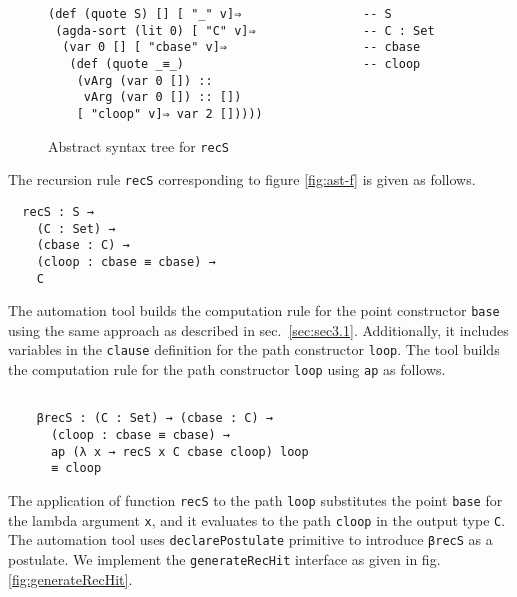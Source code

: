 \documentclass[sigplan,10pt]{acmart}
\begin{document}
\begin{figure}
\begin{center}
\begingroup
\fontsize{7pt}{9pt}\selectfont
\begin{Verbatim}
(def (quote S) [] [ "_" v]⇒                 -- S
 (agda-sort (lit 0) [ "C" v]⇒               -- C : Set
  (var 0 [] [ "cbase" v]⇒                   -- cbase
   (def (quote _≡_)                         -- cloop
    (vArg (var 0 []) ::
     vArg (var 0 []) :: [])
    [ "cloop" v]⇒ var 2 []))))
\end{Verbatim}
\endgroup
\end{center}
\caption{Abstract syntax tree for {\tt recS}}
\label{fig:ast-f}
\end{figure}
\normalsize

The recursion rule {\tt recS} corresponding to figure \eqref{fig:ast-f} is given as follows.
\begin{center}
\begingroup
\begin{BVerbatim}
  recS : S → 
    (C : Set) →
    (cbase : C) →
    (cloop : cbase ≡ cbase) →
    C
\end{BVerbatim}
\endgroup
\end{center}

The automation tool builds the computation rule for the point constructor {\tt base} using the same approach as described in sec.~\ref{sec:sec3.1}. Additionally, it includes variables in the {\tt clause} definition for the path constructor {\tt loop}. The tool builds the computation rule for the path constructor {\tt loop} using {\tt ap} as follows.

\begin{center}
\begingroup
\begin{BVerbatim}

    βrecS : (C : Set) → (cbase : C) → 
      (cloop : cbase ≡ cbase) → 
      ap (λ x → recS x C cbase cloop) loop 
      ≡ cloop
\end{BVerbatim}
\endgroup
\end{center}

The application of function {\tt recS} to the path {\tt loop} substitutes the point {\tt base} for the lambda argument {\tt x}, and it evaluates to the path {\tt cloop} in the output type {\tt C}. The automation tool uses {\tt declarePostulate} primitive to introduce {\tt βrecS} as a postulate. We implement the {\tt generateRecHit} interface as given in fig.\eqref{fig:generateRecHit}.
\end{document}

